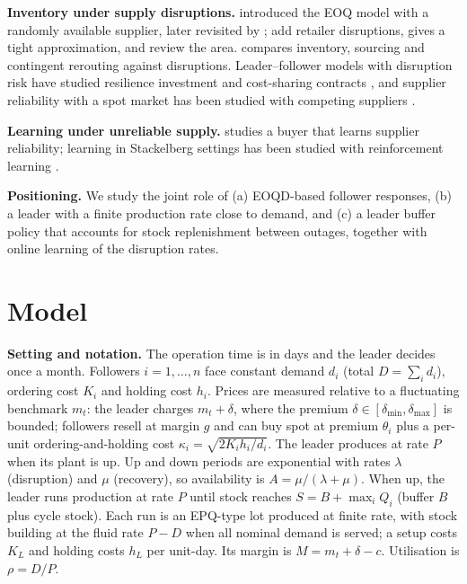 \documentclass{ifacconf}
\newcommand{\rev}[1]{#1}
\newcommand{\dl}{\delta}
\begin{document}
\textbf{Inventory under supply disruptions.} \citet{parlar1991} introduced the EOQ model with a randomly available supplier, later revisited by \citet{berk1994}; \citet{qi2009} add retailer disruptions, \citet{snyder2014} gives a tight approximation, and \citet{snyder2016} review the area. \citet{tomlin2006} compares inventory, sourcing and contingent rerouting against disruptions. Leader--follower models with disruption risk have studied resilience investment and cost-sharing contracts \citep{luo2024}, and supplier reliability with a spot market has been studied with competing suppliers \citep{gumus2012}.

\textbf{Learning under unreliable supply.} \citet{tomlin2009} studies a buyer that learns supplier reliability; learning in Stackelberg settings has been studied with reinforcement learning \citep{brero2024}.

\rev{\textbf{Positioning.} We study the joint role of (a) EOQD-based follower responses, (b) a leader with a finite production rate close to demand, and (c) a leader buffer policy that accounts for stock replenishment between outages, together with online learning of the disruption rates.}

\section{Model}
\textbf{Setting and notation.} The operation time is in days and the leader decides once a month. Followers $i=1,\dots,n$ face constant demand $d_i$ (total $D=\sum_id_i$), ordering cost $K_i$ and holding cost $h_i$. Prices are measured relative to a fluctuating benchmark $m_t$: the leader charges $m_t+\dl$, where the premium $\dl\in[\dl_{\min},\dl_{\max}]$ is bounded; followers resell at margin $g$ and can buy spot at premium $\theta_i$ plus a per-unit ordering-and-holding cost $\kappa_i=\sqrt{2K_ih_i/d_i}$. The leader produces at rate $P$ when its plant is up. Up and down periods are exponential with rates $\lambda$ (disruption) and $\mu$ (recovery), so availability is $A=\mu/(\lambda+\mu)$. When up, the leader runs production at rate $P$ until stock reaches $S=B+\max_iQ_i$ (buffer $B$ plus cycle stock). Each run is an EPQ-type lot produced at finite rate, \rev{with stock building at the fluid rate $P-D$ when all nominal demand is served}; a setup costs $K_L$ and holding costs $h_L$ per unit-day. Its margin is $M=m_t+\dl-c$. Utilisation is $\rho=D/P$.
\end{document}
